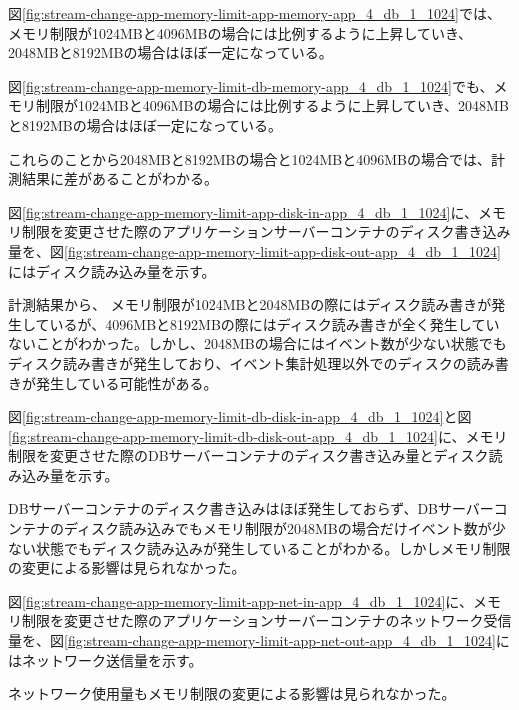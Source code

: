 \documentclass[../../../../main]{subfiles}
\begin{document}
    

    

    図\ref{fig:stream-change-app-memory-limit-app-memory-app_4_db_1_1024}では、メモリ制限が1024MBと4096MBの場合には比例するように上昇していき、2048MBと8192MBの場合はほぼ一定になっている。

    図\ref{fig:stream-change-app-memory-limit-db-memory-app_4_db_1_1024}でも、メモリ制限が1024MBと4096MBの場合には比例するように上昇していき、2048MBと8192MBの場合はほぼ一定になっている。

    これらのことから2048MBと8192MBの場合と1024MBと4096MBの場合では、計測結果に差があることがわかる。


    図\ref{fig:stream-change-app-memory-limit-app-disk-in-app_4_db_1_1024}に、メモリ制限を変更させた際のアプリケーションサーバーコンテナのディスク書き込み量を、図\ref{fig:stream-change-app-memory-limit-app-disk-out-app_4_db_1_1024}にはディスク読み込み量を示す。

    
    

    計測結果から、 メモリ制限が1024MBと2048MBの際にはディスク読み書きが発生しているが、4096MBと8192MBの際にはディスク読み書きが全く発生していないことがわかった。しかし、2048MBの場合にはイベント数が少ない状態でもディスク読み書きが発生しており、イベント集計処理以外でのディスクの読み書きが発生している可能性がある。

    図\ref{fig:stream-change-app-memory-limit-db-disk-in-app_4_db_1_1024}と図\ref{fig:stream-change-app-memory-limit-db-disk-out-app_4_db_1_1024}に、メモリ制限を変更させた際のDBサーバーコンテナのディスク書き込み量とディスク読み込み量を示す。

    
    

    DBサーバーコンテナのディスク書き込みはほぼ発生しておらず、DBサーバーコンテナのディスク読み込みでもメモリ制限が2048MBの場合だけイベント数が少ない状態でもディスク読み込みが発生していることがわかる。しかしメモリ制限の変更による影響は見られなかった。


    図\ref{fig:stream-change-app-memory-limit-app-net-in-app_4_db_1_1024}に、メモリ制限を変更させた際のアプリケーションサーバーコンテナのネットワーク受信量を、図\ref{fig:stream-change-app-memory-limit-app-net-out-app_4_db_1_1024}にはネットワーク送信量を示す。

    
    

    ネットワーク使用量もメモリ制限の変更による影響は見られなかった。
\end{document}
